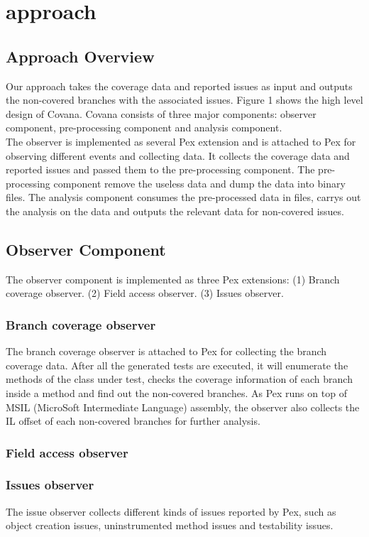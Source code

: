 \section{approach}
\subsection{Approach Overview}
Our approach takes the coverage data and reported issues as input and outputs the non-covered branches with the associated issues. Figure 1 shows the high level design of Covana. Covana consists of three major components: observer component, pre-processing component and analysis component.
\\The observer is implemented as several Pex extension and is attached to Pex for observing different events and collecting data. It collects the coverage data and reported issues and passed them to the pre-processing component. The pre-processing component remove the useless data and dump the data into binary files. The analysis component consumes the pre-processed data in files, carrys out the analysis on the data and outputs the relevant data for non-covered issues.
\subsection{Observer Component}
The observer component is implemented as three Pex extensions: (1) Branch coverage observer. (2) Field access observer. (3) Issues observer.
\subsubsection{Branch coverage observer}
The branch coverage observer is attached to Pex for collecting the branch coverage data. After all the generated tests are executed, it will enumerate the methods of the class under test, checks the coverage information of each branch inside a method and find out the non-covered branches. As Pex runs on top of MSIL (MicroSoft Intermediate Language) assembly, the observer also collects the IL offset of each non-covered branches for further analysis.
\subsubsection{Field access observer}

\subsubsection{Issues observer}
The issue observer collects different kinds of issues reported by Pex, such as object creation issues, uninstrumented method issues and testability issues.

